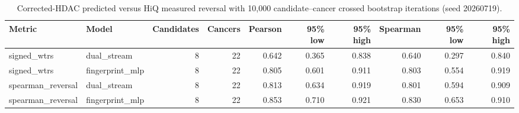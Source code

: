 \begin{landscape}
\begingroup
\scriptsize
\begin{table}[H]
\centering
\caption{Corrected-HDAC predicted versus HiQ measured reversal with 10,000 candidate--cancer crossed bootstrap iterations (seed 20260719).}
\label{tab:s_twoway}
\begin{tabular}{@{}llrrrrrrrr@{}}
\toprule
Metric & Model & Candidates & Cancers & Pearson & 95\% low & 95\% high & Spearman & 95\% low & 95\% high \\
\midrule
signed\_wtrs & dual\_stream & 8 & 22 & 0.642 & 0.365 & 0.838 & 0.640 & 0.297 & 0.840 \\
signed\_wtrs & fingerprint\_mlp & 8 & 22 & 0.805 & 0.601 & 0.911 & 0.803 & 0.554 & 0.919 \\
spearman\_reversal & dual\_stream & 8 & 22 & 0.813 & 0.634 & 0.919 & 0.801 & 0.594 & 0.909 \\
spearman\_reversal & fingerprint\_mlp & 8 & 22 & 0.853 & 0.710 & 0.921 & 0.830 & 0.653 & 0.910 \\
\bottomrule
\end{tabular}
\end{table}
\endgroup
\end{landscape}

